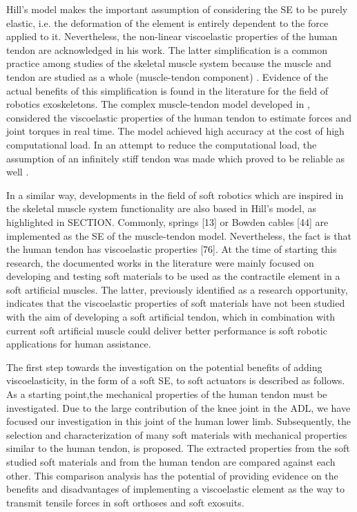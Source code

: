 Hill's model makes the important assumption of considering the SE to be purely elastic, i.e. the deformation of the element is entirely dependent to the force applied to it. Nevertheless, the non-linear viscoelastic properties of the human tendon are acknowledged in his work. The latter simplification is a common practice among studies of the skeletal muscle system because the muscle and tendon are studied as a whole (muscle-tendon component) \cite{zajac1989muscle}. Evidence of the actual benefits of this simplification is found in the literature for the field of robotics exoskeletons. The complex muscle-tendon model developed in \cite{lloyd2003emg}, considered the viscoelastic properties of the human tendon to estimate forces and joint torques in real time. The model achieved high accuracy at the cost of high computational load. In an attempt to reduce the computational load, the assumption of an infinitely stiff tendon was made which proved to be reliable as well \cite{sartori2009stiff}.

In a similar way, developments in the field of soft robotics which are inspired in the skeletal muscle system functionality are also based in Hill's model, as highlighted in SECTION. Commonly, springs [13] or Bowden cables [44] are implemented as the SE of the muscle-tendon model. Nevertheless, the fact is that the human tendon has viscoelastic properties [76]. At the time of starting this research, the documented works in the literature were mainly focused on developing and testing soft materials to be used as the contractile element in a soft artificial muscles. The latter, previously identified as a research opportunity, indicates that the viscoelastic properties of soft materials have not been studied with the aim of developing a soft artificial tendon, which in combination with current soft artificial muscle could deliver better performance is soft robotic applications for human assistance.

The first step towards the investigation on the potential benefits of adding viscoelasticity, in the form of a soft SE, to soft actuators is described as follows. As a starting point,the mechanical properties of the human tendon must be investigated. Due to the large contribution of the knee joint in the ADL, we have focused our investigation in this joint of the human lower limb. Subsequently, the selection and characterization of many soft materials with mechanical properties similar to the human tendon, is proposed. The extracted properties from the soft studied soft materials and from the human tendon are compared against each other. This comparison analysis has the potential of providing evidence on the benefits and disadvantages of implementing a viscoelastic element as the way to transmit tensile forces in soft orthoses and soft exosuits.

